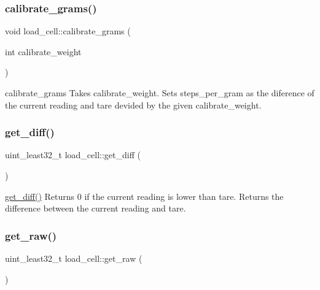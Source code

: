 \subsubsection{\texorpdfstring{calibrate\+\_\+grams()}{calibrate\_grams()}}
{\footnotesize\ttfamily void load\+\_\+cell\+::calibrate\+\_\+grams (\begin{DoxyParamCaption}\item[{int}]{calibrate\+\_\+weight }\end{DoxyParamCaption})}



calibrate\+\_\+grams Takes \textquotesingle{}calibrate\+\_\+weight\textquotesingle{}. Sets \textquotesingle{}steps\+\_\+per\+\_\+gram\textquotesingle{} as the diference of the current reading and tare devided by the given \textquotesingle{}calibrate\+\_\+weight\textquotesingle{}. 

\mbox{\label{classload__cell_a2cc447989cf3757b51b0fdbc68ba2e58}} 
\subsubsection{\texorpdfstring{get\+\_\+diff()}{get\_diff()}}
{\footnotesize\ttfamily uint\+\_\+least32\+\_\+t load\+\_\+cell\+::get\+\_\+diff (\begin{DoxyParamCaption}{ }\end{DoxyParamCaption})}



\hyperlink{classload__cell_a2cc447989cf3757b51b0fdbc68ba2e58}{get\+\_\+diff()} Returns 0 if the current reading is lower than tare. Returns the difference between the current reading and tare. 

\mbox{\label{classload__cell_ad399c39975e7a62d994566aff4171571}} 
\subsubsection{\texorpdfstring{get\+\_\+raw()}{get\_raw()}}
{\footnotesize\ttfamily uint\+\_\+least32\+\_\+t load\+\_\+cell\+::get\+\_\+raw (\begin{DoxyParamCaption}{ }\end{DoxyParamCaption})}



